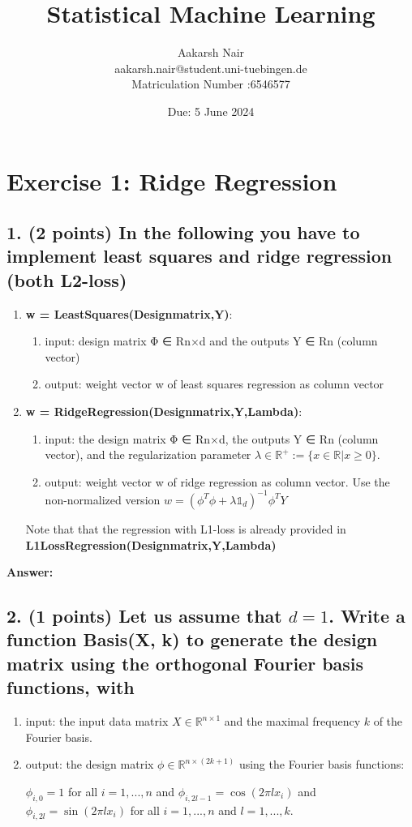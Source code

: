 \documentclass{./tufte-handout}
\title{Statistical Machine Learning}
\author[Aakarsh Nair]{Aakarsh Nair\\aakarsh.nair@student.uni-tuebingen.de  \\Matriculation Number :6546577 }
\date{Due: 5 June 2024}
\begin{document}
\maketitle

\section{Exercise 1: Ridge Regression}

\subsection{1. (2 points) In the following you have to implement least squares and ridge regression (both L2-loss)}

\begin{enumerate}
    \item \textbf{w = LeastSquares(Designmatrix,Y)}:
    \begin{enumerate}
    \item  input: design matrix Φ ∈ Rn×d and the outputs Y ∈ Rn (column vector)
    \item output: weight vector w of least squares regression as column vector
    \end{enumerate}
    \item  \textbf{w = RidgeRegression(Designmatrix,Y,Lambda)}:
    \begin{enumerate}
        \item input: the design matrix Φ ∈ Rn×d, the outputs Y ∈ Rn (column vector), and the regularization
        parameter $\lambda \in \mathbb{R}^+ := \{x \in \mathbb{R}|x \geq 0\}$.
        \item output: weight vector w of ridge regression as column vector. Use the non-normalized version
        $w = (\phi^T \phi + \lambda \mathbb{1}_d)^{−1}\phi^T Y$ 
    \end{enumerate}
    
    Note that that the regression with L1-loss is already provided in 
        \textbf{L1LossRegression(Designmatrix,Y,Lambda)}
\end{enumerate}

\textbf{Answer:}

\subsection{2. (1 points) Let us assume that $d =1$. Write a function Basis(X, k) to generate the design matrix using 
the orthogonal Fourier basis functions, with}
\begin{enumerate}
    \item input: the input data matrix $X \in \mathbb{R}^{n \times 1}$ and 
    the maximal frequency $k$ of the Fourier basis. 
    \item output: the design matrix $\phi \in \mathbb{R}^{n \times (2k+1)}$  
    using the Fourier basis functions: 
   
    $\phi_{i,0} = 1$ for all $i = 1, . . . , n$ and 
    $\phi_{i,2l-1} = \cos(2\pi l x_i)$ and 
    $\phi_{i,2l} = \sin(2\pi l x_i)$ for all 
    $i = 1, . . . , n$ and $l = 1, . . . , k$.
\end{enumerate}
\end{document}
